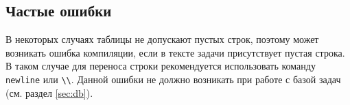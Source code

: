\setcounter{notask}{1}

\subsection{Частые ошибки}

В некоторых случаях таблицы не допускают пустых строк, поэтому может возникать ошибка компиляции, если в
тексте задачи присутствует пустая строка. В таком случае для переноса строки рекомендуется использовать
команду \texttt{newline} или \texttt{\textbackslash\textbackslash}. Данной ошибки не должно возникать при
работе с базой задач (см. раздел \ref{sec:db}).
